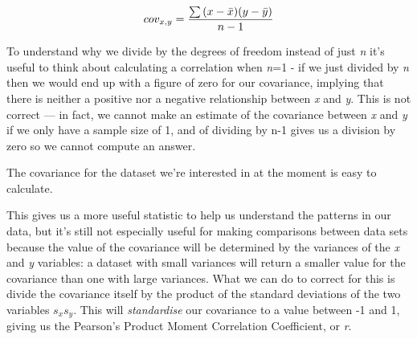 \documentclass[
]{book}
\newenvironment{Shaded}{\begin{snugshade}}{\end{snugshade}}
\newcommand{\DecValTok}[1]{\textcolor[rgb]{0.00,0.00,0.81}{#1}}
\newcommand{\FloatTok}[1]{\textcolor[rgb]{0.00,0.00,0.81}{#1}}
\newcommand{\KeywordTok}[1]{\textcolor[rgb]{0.13,0.29,0.53}{\textbf{#1}}}
\newcommand{\NormalTok}[1]{#1}
\newcommand{\OperatorTok}[1]{\textcolor[rgb]{0.81,0.36,0.00}{\textbf{#1}}}
\newcommand{\StringTok}[1]{\textcolor[rgb]{0.31,0.60,0.02}{#1}}
\begin{document}
\[ \Large cov_{x,y} = \frac{\sum{(x-\bar{x})(y-\bar{y})}}{n-1}\]

To understand why we divide by the degrees of freedom instead of just \emph{n} it's useful to think about calculating a correlation when \emph{n}=1 - if we just divided by \emph{n} then we would end up with a figure of zero for our covariance, implying that there is neither a positive nor a negative relationship between \emph{x} and \emph{y}. This is not correct --- in fact, we cannot make an estimate of the covariance between \emph{x} and \emph{y} if we only have a sample size of 1, and of dividing by n-1 gives us a division by zero so we cannot compute an answer.

The covariance for the dataset we're interested in at the moment is easy to calculate.

\begin{Shaded}
\end{Shaded}

This gives us a more useful statistic to help us understand the patterns in our data, but it's still not especially useful for making comparisons between data sets because the value of the covariance will be determined by the variances of the \emph{x} and \emph{y} variables: a dataset with small variances will return a smaller value for the covariance than one with large variances. What we can do to correct for this is divide the covariance itself by the product of the standard deviations of the two variables \(s_{x}s_{y}\). This will \emph{standardise} our covariance to a value between -1 and 1, giving us the Pearson's Product Moment Correlation Coefficient, or \emph{r}.
\end{document}
